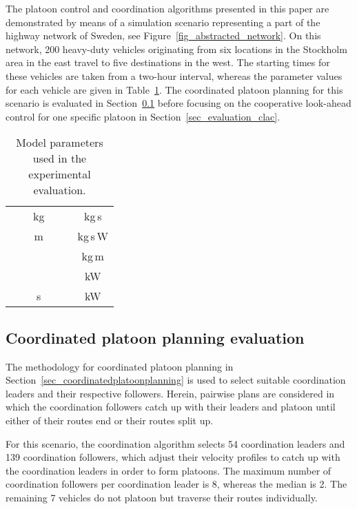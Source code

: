 \documentclass[journal]{IEEEtran}
\begin{document}
The platoon control and coordination algorithms presented in this paper are demonstrated by means of a simulation scenario representing a part of the highway network of Sweden, see Figure~\ref{fig_abstracted_network}. On this network, 200 heavy-duty vehicles originating from six locations in the Stockholm area in the east travel to five destinations in the west. The starting times for these vehicles are taken from a two-hour interval, whereas the parameter values for each vehicle are given in Table~\ref{tab_modelparameters}. The coordinated platoon planning for this scenario is evaluated in Section~\ref{sec_evaluation_platoonplanning} before focusing on the cooperative look-ahead control for one specific platoon in Section~\ref{sec_evaluation_clac}.

\begin{table}
\begin{center}
  \caption{\rm Model parameters used in the experimental evaluation.}
  \label{tab_modelparameters}
  \begin{tabular}{|ccc||ccc|}
  \hline
   &  & kg               &   &  & kg\,s \\
   &  & m               &   &  & kg\,s\,W \\
   &  & &   &  & kg\,m \\
   &  &           &   &  & kW \\
   &  & s   &   &  & kW \\
  \hline
  \end{tabular}
\end{center}
\end{table}


\subsection{Coordinated platoon planning evaluation}\label{sec_evaluation_platoonplanning}
The methodology for coordinated platoon planning in Section~\ref{sec_coordinatedplatoonplanning} is used to select suitable coordination leaders and their respective followers. Herein, pairwise plans are considered in which the coordination followers catch up with their leaders and platoon until either of their routes end or their routes split up.

For this scenario, the coordination algorithm selects 54 coordination leaders and 139 coordination followers, which adjust their velocity profiles to catch up with the coordination leaders in order to form platoons. The maximum number of coordination followers per coordination leader is 8, whereas the median is 2. The remaining 7 vehicles do not platoon but traverse their routes individually.
\end{document}
